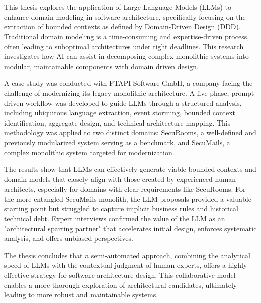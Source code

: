 \chapter{\abstractname}


This thesis explores the application of Large Language Models (LLMs) to enhance domain modeling in software architecture, specifically focusing on the extraction of bounded contexts as defined by Domain-Driven Design (DDD). Traditional domain modeling is a time-consuming and expertise-driven process, often leading to suboptimal architectures under tight deadlines. This research investigates how AI can assist in decomposing complex monolithic systems into modular, maintainable components with domain driven design.

A case study was conducted with FTAPI Software GmbH, a company facing the challenge of modernizing its legacy monolithic architecture. A five-phase, prompt-driven workflow was developed to guide LLMs through a structured analysis, including ubiquitous language extraction, event storming, bounded context identification, aggregate design, and technical architecture mapping. This methodology was applied to two distinct domains: SecuRooms, a well-defined and previously modularized system serving as a benchmark, and SecuMails, a complex monolithic system targeted for modernization.

The results show that LLMs can effectively generate viable bounded contexts and domain models that closely align with those created by experienced human architects, especially for domains with clear requirements like SecuRooms. For the more entangled SecuMails monolith, the LLM proposals provided a valuable starting point but struggled to capture implicit business rules and historical technical debt. Expert interviews confirmed the value of the LLM as an "architectural sparring partner" that accelerates initial design, enforces systematic analysis, and offers unbiased perspectives.

The thesis concludes that a semi-automated approach, combining the analytical speed of LLMs with the contextual judgment of human experts, offers a highly effective strategy for software architecture design. This collaborative model enables a more thorough exploration of architectural candidates, ultimately leading to more robust and maintainable systems.